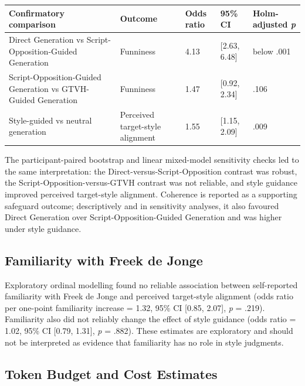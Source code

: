 \documentclass[11pt]{article}
\begin{document}
\begin{table}[t]\centering\scriptsize\begin{tabularx}{\textwidth}{YYYYY}
\toprule\noalign{}
Confirmatory comparison & Outcome & Odds ratio & 95\% CI & Holm-adjusted \emph{p} \\
\midrule\noalign{}

\bottomrule\noalign{}

Direct Generation vs Script-Opposition-Guided Generation & Funniness & 4.13 & {[}2.63, 6.48{]} & below .001 \\
Script-Opposition-Guided Generation vs GTVH-Guided Generation & Funniness & 1.47 & {[}0.92, 2.34{]} & .106 \\
Style-guided vs neutral generation & Perceived target-style alignment & 1.55 & {[}1.15, 2.09{]} & .009 \\
\end{tabularx}\end{table}

The participant-paired bootstrap and linear mixed-model sensitivity checks led to the same interpretation: the Direct-versus-Script-Opposition contrast was robust, the Script-Opposition-versus-GTVH contrast was not reliable, and style guidance improved perceived target-style alignment. Coherence is reported as a supporting safeguard outcome; descriptively and in sensitivity analyses, it also favoured Direct Generation over Script-Opposition-Guided Generation and was higher under style guidance.

\subsection{Familiarity with Freek de Jonge}\label{familiarity-with-freek-de-jonge}

Exploratory ordinal modelling found no reliable association between self-reported familiarity with Freek de Jonge and perceived target-style alignment (odds ratio per one-point familiarity increase = 1.32, 95\% CI {[}0.85, 2.07{]}, \emph{p} = .219). Familiarity also did not reliably change the effect of style guidance (odds ratio = 1.02, 95\% CI {[}0.79, 1.31{]}, \emph{p} = .882). These estimates are exploratory and should not be interpreted as evidence that familiarity has no role in style judgments.

\subsection{Token Budget and Cost Estimates}\label{token-budget-and-cost-estimates}
\end{document}
